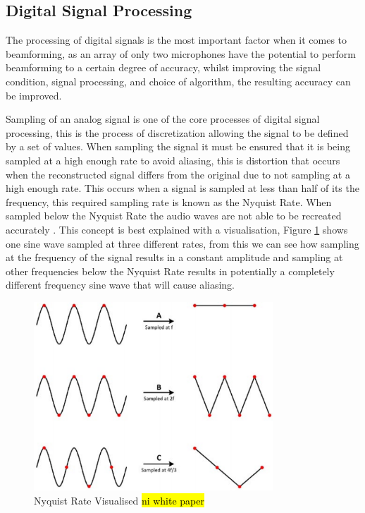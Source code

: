 \documentclass{UoNMCHA}
\numberwithin{equation}{section}
\begin{document}
\subsection{Digital Signal Processing} \label{sec:Signal Processing}
    The processing of digital signals is the most important factor when it comes to beamforming, as an array of only two microphones have the potential to perform beamforming to a certain degree of accuracy, whilst improving the signal condition, signal processing, and choice of algorithm, the resulting accuracy can be improved.
    
    Sampling of an analog signal is one of the core processes of digital signal processing, this is the process of discretization allowing the signal to be defined by a set of values. When sampling the signal it must be ensured that it is being sampled at a high enough rate to avoid aliasing, this is distortion that occurs when the reconstructed signal differs from the original due to not sampling at a high enough rate. This occurs when a signal is sampled at less than half of its the frequency, this required sampling rate is known as the Nyquist Rate. When sampled below the Nyquist Rate the audio waves are not able to be recreated accurately \citep{Ben08}. This concept is best explained with a visualisation, Figure \ref{fig:NyquistFrequency} shows one sine wave sampled at three different rates, from this we can see how sampling at the frequency of the signal results in a constant amplitude and sampling at other frequencies below the Nyquist Rate results in potentially a completely different frequency sine wave that will cause aliasing. 

    \begin{figure}[H]
        \centering
        \includegraphics[keepaspectratio, width = 0.8\textwidth]{Figures/NyquistFrequency.png}
        \caption{Nyquist Rate Visualised \hl{ni white paper}}
        \label{fig:NyquistFrequency}
    \end{figure}
    
\end{document}
